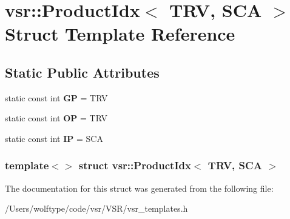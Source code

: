 \hypertarget{structvsr_1_1_product_idx_3_01_t_r_v_00_01_s_c_a_01_4}{\section{vsr\-:\-:Product\-Idx$<$ T\-R\-V, S\-C\-A $>$ Struct Template Reference}
\label{structvsr_1_1_product_idx_3_01_t_r_v_00_01_s_c_a_01_4}
}
\subsection*{Static Public Attributes}
\begin{DoxyCompactItemize}
\item 
\hypertarget{structvsr_1_1_product_idx_3_01_t_r_v_00_01_s_c_a_01_4_a78399d7d6641229550f70592b3b59fef}{static const int {\bfseries G\-P} = T\-R\-V}\label{structvsr_1_1_product_idx_3_01_t_r_v_00_01_s_c_a_01_4_a78399d7d6641229550f70592b3b59fef}

\item 
\hypertarget{structvsr_1_1_product_idx_3_01_t_r_v_00_01_s_c_a_01_4_ad8dfc41945d4a76e9327e32ff1c53c97}{static const int {\bfseries O\-P} = T\-R\-V}\label{structvsr_1_1_product_idx_3_01_t_r_v_00_01_s_c_a_01_4_ad8dfc41945d4a76e9327e32ff1c53c97}

\item 
\hypertarget{structvsr_1_1_product_idx_3_01_t_r_v_00_01_s_c_a_01_4_ad10630f2b8419021c95d34901f3bf125}{static const int {\bfseries I\-P} = S\-C\-A}\label{structvsr_1_1_product_idx_3_01_t_r_v_00_01_s_c_a_01_4_ad10630f2b8419021c95d34901f3bf125}

\end{DoxyCompactItemize}
\subsubsection*{template$<$$>$ struct vsr\-::\-Product\-Idx$<$ T\-R\-V, S\-C\-A $>$}



The documentation for this struct was generated from the following file\-:\begin{DoxyCompactItemize}
\item 
/\-Users/wolftype/code/vsr/\-V\-S\-R/vsr\-\_\-templates.\-h\end{DoxyCompactItemize}
